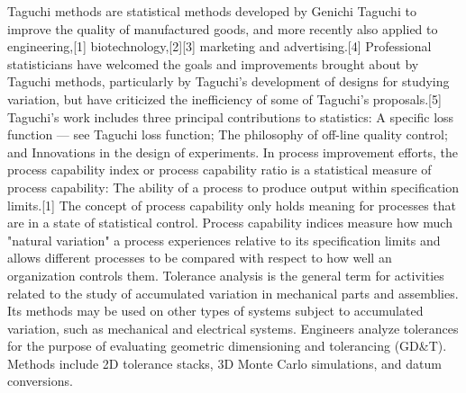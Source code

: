 Taguchi methods are statistical methods developed by Genichi Taguchi to improve the quality of manufactured goods, and more recently also applied to engineering,[1] biotechnology,[2][3] marketing and advertising.[4] Professional statisticians have welcomed the goals and improvements brought about by Taguchi methods, particularly by Taguchi's development of designs for studying variation, but have criticized the inefficiency of some of Taguchi's proposals.[5]
Taguchi's work includes three principal contributions to statistics:
 A specific loss function — see Taguchi loss function;
 The philosophy of off-line quality control; and
 Innovations in the design of experiments.
In process improvement efforts, the process capability index or process capability ratio is a statistical measure of process capability: The ability of a process to produce output within specification limits.[1] The concept of process capability only holds meaning for processes that are in a state of statistical control. Process capability indices measure how much "natural variation" a process experiences relative to its specification limits and allows different processes to be compared with respect to how well an organization controls them.
Tolerance analysis is the general term for activities related to the study of accumulated variation in mechanical parts and assemblies. Its methods may be used on other types of systems subject to accumulated variation, such as mechanical and electrical systems. Engineers analyze tolerances for the purpose of evaluating geometric dimensioning and tolerancing (GD&T). Methods include 2D tolerance stacks, 3D Monte Carlo simulations, and datum conversions.
 
